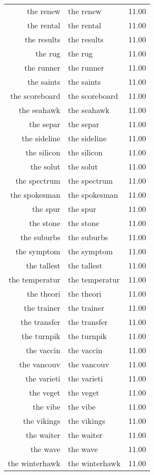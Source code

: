 \begin{table}[ht]
\begin{tabular}{rlr}
  the renew & the renew & 11.00 \\ 
  the rental & the rental & 11.00 \\ 
  the results & the results & 11.00 \\ 
  the rug & the rug & 11.00 \\ 
  the runner & the runner & 11.00 \\ 
  the saints & the saints & 11.00 \\ 
  the scoreboard & the scoreboard & 11.00 \\ 
  the seahawk & the seahawk & 11.00 \\ 
  the separ & the separ & 11.00 \\ 
  the sideline & the sideline & 11.00 \\ 
  the silicon & the silicon & 11.00 \\ 
  the solut & the solut & 11.00 \\ 
  the spectrum & the spectrum & 11.00 \\ 
  the spokesman & the spokesman & 11.00 \\ 
  the spur & the spur & 11.00 \\ 
  the stone & the stone & 11.00 \\ 
  the suburbs & the suburbs & 11.00 \\ 
  the symptom & the symptom & 11.00 \\ 
  the tallest & the tallest & 11.00 \\ 
  the temperatur & the temperatur & 11.00 \\ 
  the theori & the theori & 11.00 \\ 
  the trainer & the trainer & 11.00 \\ 
  the transfer & the transfer & 11.00 \\ 
  the turnpik & the turnpik & 11.00 \\ 
  the vaccin & the vaccin & 11.00 \\ 
  the vancouv & the vancouv & 11.00 \\ 
  the varieti & the varieti & 11.00 \\ 
  the veget & the veget & 11.00 \\ 
  the vibe & the vibe & 11.00 \\ 
  the vikings & the vikings & 11.00 \\ 
  the waiter & the waiter & 11.00 \\ 
  the wave & the wave & 11.00 \\ 
  the winterhawk & the winterhawk & 11.00 \\ 

\end{tabular}
\end{table}
